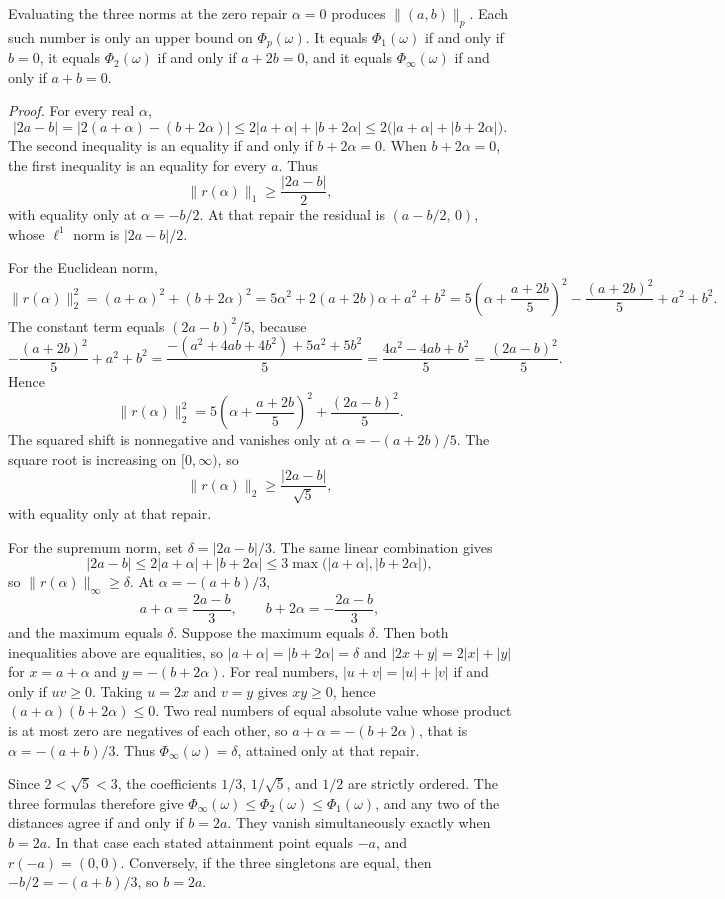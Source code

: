 \documentclass[
  11pt,
]{article}
\theoremstyle{plain}
\theoremstyle{definition}\newtheorem{definition}[theorem]{Definition}
\theoremstyle{remark}\newtheorem*{remark}{Remark}
\begin{document}
Evaluating the three norms at the zero repair \(\alpha=0\) produces
\(\|(a,b)\|_p\). Each such number is only an upper bound on
\(\Phi_p(\omega)\). It equals \(\Phi_1(\omega)\) if and only if \(b=0\),
it equals \(\Phi_2(\omega)\) if and only if \(a+2b=0\), and it equals
\(\Phi_\infty(\omega)\) if and only if \(a+b=0\).

\emph{Proof.} For every real \(\alpha\),
\[|2a-b|=|2(a+\alpha)-(b+2\alpha)|\le 2|a+\alpha|+|b+2\alpha|\le 2\bigl(|a+\alpha|+|b+2\alpha|\bigr).\]
The second inequality is an equality if and only if \(b+2\alpha=0\).
When \(b+2\alpha=0\), the first inequality is an equality for every
\(a\). Thus \[\|r(\alpha)\|_1\ge\frac{|2a-b|}{2},\] with equality only
at \(\alpha=-b/2\). At that repair the residual is \((a-b/2,\,0)\),
whose \(\ell^1\) norm is \(|2a-b|/2\).

For the Euclidean norm,
\[\|r(\alpha)\|_2^2=(a+\alpha)^2+(b+2\alpha)^2=5\alpha^2+2(a+2b)\alpha+a^2+b^2=5\left(\alpha+\frac{a+2b}{5}\right)^2-\frac{(a+2b)^2}{5}+a^2+b^2.\]
The constant term equals \((2a-b)^2/5\), because
\[-\frac{(a+2b)^2}{5}+a^2+b^2=\frac{-(a^2+4ab+4b^2)+5a^2+5b^2}{5}=\frac{4a^2-4ab+b^2}{5}=\frac{(2a-b)^2}{5}.\]
Hence
\[\|r(\alpha)\|_2^2=5\left(\alpha+\frac{a+2b}{5}\right)^2+\frac{(2a-b)^2}{5}.\]
The squared shift is nonnegative and vanishes only at
\(\alpha=-(a+2b)/5\). The square root is increasing on \([0,\infty)\),
so \[\|r(\alpha)\|_2\ge\frac{|2a-b|}{\sqrt{5}},\] with equality only at
that repair.

For the supremum norm, set \(\delta=|2a-b|/3\). The same linear
combination gives
\[|2a-b|\le 2|a+\alpha|+|b+2\alpha|\le 3\max\bigl(|a+\alpha|,|b+2\alpha|\bigr),\]
so \(\|r(\alpha)\|_\infty\ge\delta\). At \(\alpha=-(a+b)/3\),
\[a+\alpha=\frac{2a-b}{3},\qquad b+2\alpha=-\frac{2a-b}{3},\] and the
maximum equals \(\delta\). Suppose the maximum equals \(\delta\). Then
both inequalities above are equalities, so
\(|a+\alpha|=|b+2\alpha|=\delta\) and \(|2x+y|=2|x|+|y|\) for
\(x=a+\alpha\) and \(y=-(b+2\alpha)\). For real numbers,
\(|u+v|=|u|+|v|\) if and only if \(uv\ge 0\). Taking \(u=2x\) and
\(v=y\) gives \(xy\ge 0\), hence \((a+\alpha)(b+2\alpha)\le 0\). Two
real numbers of equal absolute value whose product is at most zero are
negatives of each other, so \(a+\alpha=-(b+2\alpha)\), that is
\(\alpha=-(a+b)/3\). Thus \(\Phi_\infty(\omega)=\delta\), attained only
at that repair.

Since \(2<\sqrt{5}<3\), the coefficients \(1/3\), \(1/\sqrt{5}\), and
\(1/2\) are strictly ordered. The three formulas therefore give
\(\Phi_\infty(\omega)\le\Phi_2(\omega)\le\Phi_1(\omega)\), and any two
of the distances agree if and only if \(b=2a\). They vanish
simultaneously exactly when \(b=2a\). In that case each stated
attainment point equals \(-a\), and \(r(-a)=(0,0)\). Conversely, if the
three singletons are equal, then \(-b/2=-(a+b)/3\), so \(b=2a\).
\end{document}
